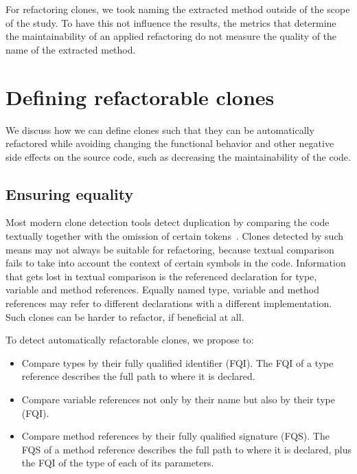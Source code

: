 \documentclass[sigconf,review,anonymous]{acmart}
\begin{document}
For refactoring clones, we took naming the extracted method outside of the scope of the study. To have this not influence the results, the metrics that determine the maintainability of an applied refactoring do not measure the quality of the name of the extracted method. 

\section{Defining refactorable clones}\label{sec:research}
We discuss how we can define clones such that they can be automatically refactored while avoiding changing the functional behavior and other negative side effects on the source code, such as decreasing the maintainability of the code.

\subsection{Ensuring equality}\label{sec:t1r}
Most modern clone detection tools detect duplication by comparing the code textually together with the omission of certain tokens~\cite{roy2009comparison, svajlenko2014evaluating}. Clones detected by such means may not always be suitable for refactoring, because textual comparison fails to take into account the context of certain symbols in the code. Information that gets lost in textual comparison is the referenced declaration for type, variable and method references. Equally named type, variable and method references may refer to different declarations with a different implementation. Such clones can be harder to refactor, if beneficial at all.

To detect automatically refactorable clones, we propose to:
\begin{itemize}
  \item Compare types by their fully qualified identifier (FQI). The FQI of a type reference describes the full path to where it is declared.
  \item Compare variable references not only by their name but also by their type (FQI).
  \item Compare method references by their fully qualified signature (FQS). The FQS of a method reference describes the full path to where it is declared, plus the FQI of the type of each of its parameters.
\end{itemize}
\end{document}
